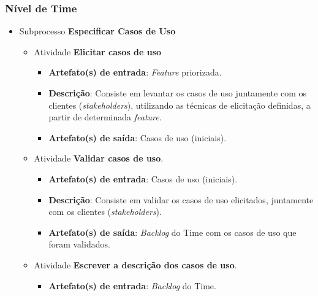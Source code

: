 
  \subsubsection{Nível de Time}
    
    \begin{itemize}
	
     \item Subprocesso \textbf{Especificar Casos de Uso}
	
	\begin{itemize}
	  \item Atividade \textbf{Elicitar casos de uso}
	      
	      \begin{itemize}
		  \item \textbf{Artefato(s) de entrada}: \textit{Feature} priorizada.
		  
		  \item \textbf{Descrição}: Consiste em levantar os casos de uso juntamente com os clientes
		    (\textit{stakeholders}), utilizando as técnicas de elicitação definidas,  a partir de determinada
		    \textit{feature}.
		  
		  \item \textbf{Artefato(s) de saída}: Casos de uso (iniciais).
		    
		\end{itemize}
	    
	    \item Atividade \textbf{Validar casos de uso}.
	    
		\begin{itemize}
		  \item \textbf{Artefato(s) de entrada}: Casos de uso (iniciais).
		  
		  \item \textbf{Descrição}: Consiste em validar os casos de uso elicitados, juntamente com os
		    clientes (\textit{stakeholders}).
		  
		  \item \textbf{Artefato(s) de saída}: \textit{Backlog} do Time com os casos de uso que foram validados.
			
		\end{itemize}
		
	    \item Atividade \textbf{Escrever a descrição dos casos de uso}.
	    
		\begin{itemize}
		  \item \textbf{Artefato(s) de entrada}: \textit{Backlog} do Time.
		  

\end{itemize}
\end{itemize}
\end{itemize}
